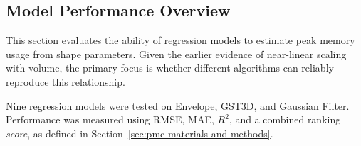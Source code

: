 \subsection{Model Performance Overview}
\label{subsec:pmc-results-model-performance-overview}

This section evaluates the ability of regression models to estimate peak memory usage from shape parameters.
Given the earlier evidence of near-linear scaling with volume, the primary focus is whether different algorithms can reliably reproduce this relationship.

Nine regression models were tested on Envelope, \ac{GST3D}, and Gaussian Filter.
Performance was measured using \ac{RMSE}, \ac{MAE}, $R^2$, and a combined ranking \textit{score}, as defined in Section~\ref{sec:pmc-materials-and-methods}.

